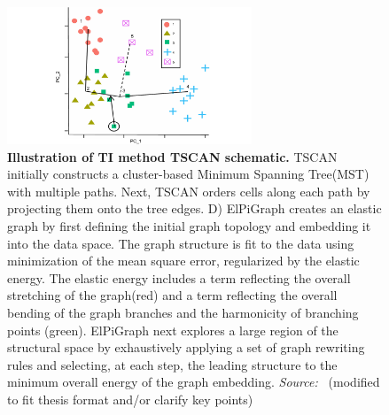 \begin{description}
  \begin{figure}[ht!]
  	\centering
  	\includegraphics[width=0.65\textwidth]{TI_Alg_TSCAN/fig}
  	\vspace{0.1cm}
  	\caption[Illustration of TI method TSCAN schematic.]{\textbf{Illustration of TI method TSCAN schematic.}
  	TSCAN initially constructs a cluster-based Minimum Spanning Tree(MST) with multiple paths. Next, TSCAN orders cells along each path by projecting them onto the tree edges.
  	D) ElPiGraph creates an elastic graph by first defining the initial graph topology and embedding it into the data space. The graph structure is fit to the data using minimization of the mean square error, regularized by the elastic energy. The elastic energy includes a term reflecting the overall stretching of the graph(red) and a term reflecting the overall bending of the graph branches and the harmonicity of branching points (green). ElPiGraph next explores a large region of the structural space by exhaustively applying a set of graph rewriting rules and selecting, at each step, the leading structure to the minimum overall energy of the graph embedding. \emph{Source:~\cite{ji2016tscan}} (modified to fit thesis format and/or clarify key points)
  	}
  	\label{fig:TI_Alg_TSCAN}
  \end{figure}
\end{description}

